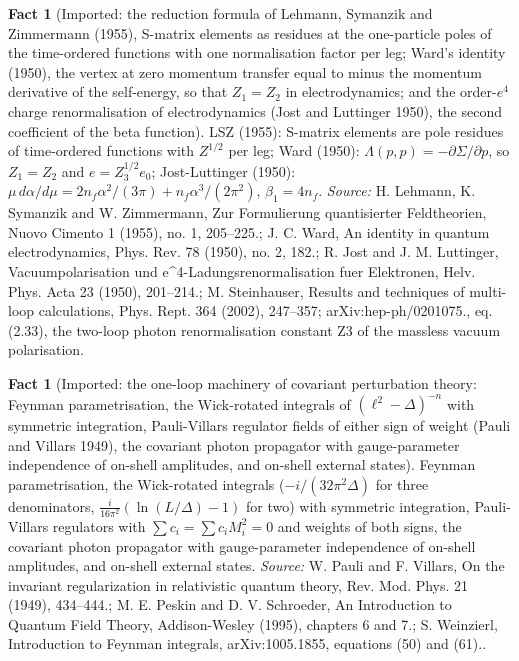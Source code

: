 \documentclass[11pt]{article}
\theoremstyle{definition}
\newtheorem{fact}[theorem]{Fact}
\theoremstyle{plain}
\begin{document}
\begin{fact}[Imported: the reduction formula of Lehmann, Symanzik and Zimmermann (1955), S-matrix elements as residues at the one-particle poles of the time-ordered functions with one normalisation factor per leg; Ward's identity (1950), the vertex at zero momentum transfer equal to minus the momentum derivative of the self-energy, so that $Z_{1} = Z_{2}$ in electrodynamics; and the order-$e^{4}$ charge renormalisation of electrodynamics (Jost and Luttinger 1950), the second coefficient of the beta function]\label{c:synthesis.imported-lsz-reduction-ward-identity-and-the-second-qed-beta-coefficient}
LSZ (1955): S-matrix elements are pole residues of time-ordered functions with $Z^{1/2}$ per leg; Ward (1950): $\Lambda(p,p) = -\partial\Sigma/\partial p$, so $Z_{1} = Z_{2}$ and $e = Z_{3}^{1/2}e_{0}$; Jost-Luttinger (1950): $\mu\,d\alpha/d\mu = 2n_{f}\alpha^{2}/(3\pi) + n_{f}\alpha^{3}/(2\pi^{2})$, $\beta_{1} = 4n_{f}$.
\emph{Source:} H. Lehmann, K. Symanzik and W. Zimmermann, Zur Formulierung quantisierter Feldtheorien, Nuovo Cimento 1 (1955), no. 1, 205--225.; J. C. Ward, An identity in quantum electrodynamics, Phys. Rev. 78 (1950), no. 2, 182.; R. Jost and J. M. Luttinger, Vacuumpolarisation und e\^{}4-Ladungsrenormalisation fuer Elektronen, Helv. Phys. Acta 23 (1950), 201--214.; M. Steinhauser, Results and techniques of multi-loop calculations, Phys. Rept. 364 (2002), 247--357; arXiv:hep-ph/0201075., eq. (2.33), the two-loop photon renormalisation constant Z3 of the massless vacuum polarisation.
\end{fact}

\begin{fact}[Imported: the one-loop machinery of covariant perturbation theory: Feynman parametrisation, the Wick-rotated integrals of $(\ell^{2} - \Delta)^{-n}$ with symmetric integration, Pauli-Villars regulator fields of either sign of weight (Pauli and Villars 1949), the covariant photon propagator with gauge-parameter independence of on-shell amplitudes, and on-shell external states]\label{c:synthesis.imported-one-loop-integrals-and-pauli-villars-regulators}
Feynman parametrisation, the Wick-rotated integrals ($-i/(32\pi^{2}\Delta)$ for three denominators, $\tfrac{i}{16\pi^{2}}(\ln(L/\Delta) - 1)$ for two) with symmetric integration, Pauli-Villars regulators with $\sum c_{i} = \sum c_{i}M_{i}^{2} = 0$ and weights of both signs, the covariant photon propagator with gauge-parameter independence of on-shell amplitudes, and on-shell external states.
\emph{Source:} W. Pauli and F. Villars, On the invariant regularization in relativistic quantum theory, Rev. Mod. Phys. 21 (1949), 434--444.; M. E. Peskin and D. V. Schroeder, An Introduction to Quantum Field Theory, Addison-Wesley (1995), chapters 6 and 7.; S. Weinzierl, Introduction to Feynman integrals, arXiv:1005.1855, equations (50) and (61)..
\end{fact}
\end{document}
